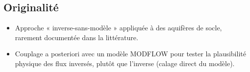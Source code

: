 \subsection{Originalité}
\label{sec:originalite}

\begin{itemize}[leftmargin=1.5em]
    \item Approche « inverse-sans-modèle » appliquée à des aquifères de socle, rarement documentée dans la littérature.
    \item Couplage a posteriori avec un modèle MODFLOW pour tester la plausibilité physique des flux inversés, plutôt que l’inverse (calage direct du modèle).
\end{itemize}
